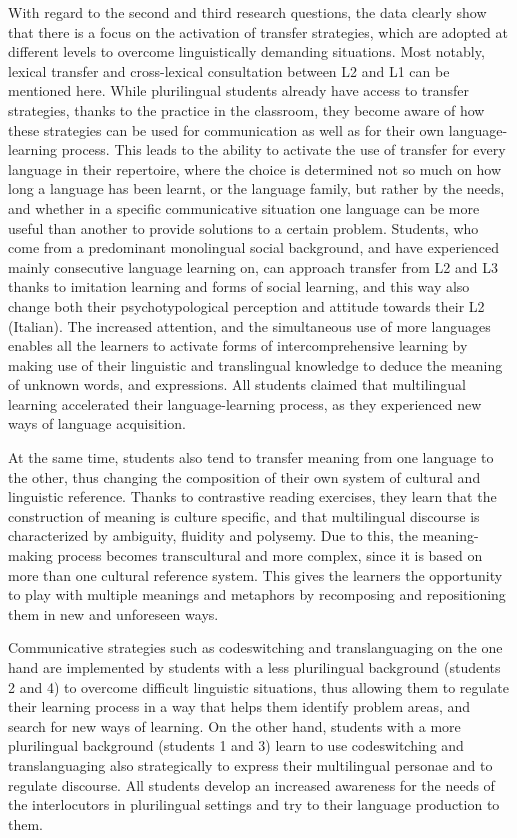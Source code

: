 \documentclass[output=paper]{../langscibook}
\begin{document}
With regard to the second and third research questions, the data clearly show that there is a focus on the activation of transfer strategies, which are adopted at different levels to overcome linguistically demanding situations. Most notably, lexical transfer and cross-lexical consultation between L2 and L1 can be mentioned here. While plurilingual students already have access to transfer strategies, thanks to the practice in the classroom, they become aware of how these strategies can be used for communication as well as for their own language-learning process. This leads to the ability to activate the use of transfer for every language in their repertoire, where the choice is determined not so much on how long a language has been learnt, or the language family, but rather by the needs, and whether in a specific communicative situation one language can be more useful than another to provide solutions to a certain problem. Students, who come from a predominant monolingual social background, and have experienced mainly consecutive language learning on, can approach transfer from L2 and L3 thanks to imitation learning and forms of social learning, and this way also change both their psychotypological perception and attitude towards their L2 (Italian). The increased attention, and the simultaneous use of more languages enables all the learners to activate forms of intercomprehensive learning by making use of their linguistic and translingual knowledge to deduce the meaning of unknown words, and expressions. All students claimed that multilingual learning accelerated their language-learning process, as they experienced new ways of language acquisition. 

At the same time, students also tend to transfer meaning from one language to the other, thus changing the composition of their own system of cultural and linguistic reference. Thanks to contrastive reading exercises, they learn that the construction of meaning is culture specific, and that multilingual discourse is characterized by ambiguity, fluidity and polysemy. Due to this, the meaning-making process becomes transcultural and more complex, since it is based on more than one cultural reference system. This gives the learners the opportunity to play with multiple meanings and metaphors by recomposing and repositioning them in new and unforeseen ways. 

Communicative strategies such as codeswitching and translanguaging on the one hand are implemented by students with a less plurilingual background (students 2 and 4) to overcome difficult linguistic situations, thus allowing them to regulate their learning process in a way that helps them identify problem areas, and search for new ways of learning. On the other hand, students with a more plurilingual background (students 1 and 3) learn to use codeswitching and translanguaging also strategically to express their multilingual personae and to regulate discourse. All students develop an increased awareness for the needs of the interlocutors in plurilingual settings and try to their language production to them. 
\end{document}
